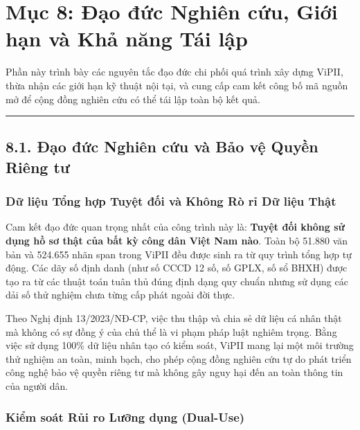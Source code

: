 \documentclass[
  11pt,
  a4paper,
]{article}
\begin{document}
\section{Mục 8: Đạo đức Nghiên cứu, Giới hạn và Khả năng Tái
lập}\label{mux1ee5c-8-ux111ux1ea1o-ux111ux1ee9c-nghiuxean-cux1ee9u-giux1edbi-hux1ea1n-vuxe0-khux1ea3-nux103ng-tuxe1i-lux1eadp}

Phần này trình bày các nguyên tắc đạo đức chi phối quá trình xây dựng ViPII, thừa nhận các giới hạn
kỹ thuật nội tại, và cung cấp cam kết công bố mã nguồn mở để cộng đồng nghiên cứu có thể tái lập
toàn bộ kết quả.

\begin{center}\rule{0.5\linewidth}{0.5pt}\end{center}

\subsection{8.1. Đạo đức Nghiên cứu và Bảo vệ Quyền Riêng
tư}\label{ux111ux1ea1o-ux111ux1ee9c-nghiuxean-cux1ee9u-vuxe0-bux1ea3o-vux1ec7-quyux1ec1n-riuxeang-tux1b0}

\subsubsection{Dữ liệu Tổng hợp Tuyệt đối và Không Rò rỉ Dữ liệu
Thật}\label{dux1eef-liux1ec7u-tux1ed5ng-hux1ee3p-tuyux1ec7t-ux111ux1ed1i-vuxe0-khuxf4ng-ruxf2-rux1ec9-dux1eef-liux1ec7u-thux1eadt}

Cam kết đạo đức quan trọng nhất của công trình này là: \textbf{Tuyệt đối không sử dụng hồ sơ thật
của bất kỳ công dân Việt Nam nào}. Toàn bộ 51.880 văn bản và 524.655 nhãn span trong ViPII đều được
sinh ra từ quy trình tổng hợp tự động. Các dãy số định danh (như số CCCD 12 số, số GPLX, số sổ BHXH)
được tạo ra từ các thuật toán tuân thủ đúng định dạng quy chuẩn nhưng sử dụng các dải số thử nghiệm
chưa từng cấp phát ngoài đời thực.

Theo Nghị định 13/2023/NĐ-CP, việc thu thập và chia sẻ dữ liệu cá nhân thật mà không có sự đồng ý
của chủ thể là vi phạm pháp luật nghiêm trọng. Bằng việc sử dụng 100\% dữ liệu nhân tạo có kiểm
soát, ViPII mang lại một môi trường thử nghiệm an toàn, minh bạch, cho phép cộng đồng nghiên cứu tự
do phát triển công nghệ bảo vệ quyền riêng tư mà không gây nguy hại đến an toàn thông tin của người
dân.

\subsubsection{Kiểm soát Rủi ro Lưỡng dụng
(Dual-Use)}\label{kiux1ec3m-souxe1t-rux1ee7i-ro-lux1b0ux1ee1ng-dux1ee5ng-dual-use}
\end{document}

